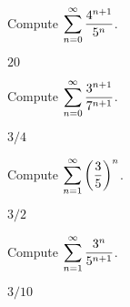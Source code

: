 \begin{exercises}
\begin{exercise} Compute $\displaystyle\sum_{n=0}^\infty {4^{n+1}\over 5^n}$.
\begin{answer} $20$
\end{answer}\end{exercise}

\begin{exercise} Compute $\displaystyle\sum_{n=0}^\infty {3^{n+1}\over 7^{n+1}}$.
\begin{answer} $3/4$
\end{answer}\end{exercise}

\begin{exercise} Compute $\displaystyle\sum_{n=1}^\infty \left({3\over 5}\right)^n$.
\begin{answer} $3/2$
\end{answer}\end{exercise}

\begin{exercise} Compute $\displaystyle\sum_{n=1}^\infty {3^n\over 5^{n+1}}$.
\begin{answer} $3/10$
\end{answer}\end{exercise}

\endtwocol

\end{exercises}

